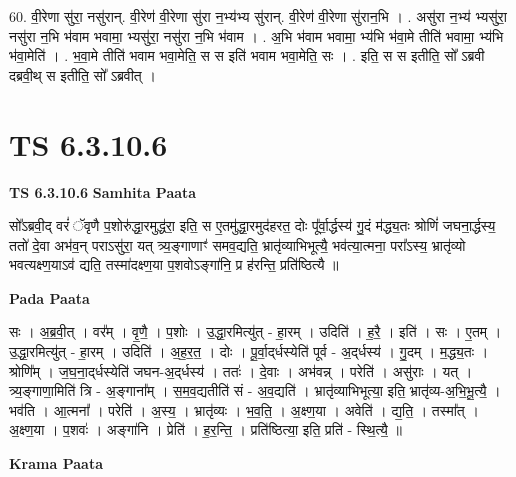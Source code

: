 \documentclass[17pt]{extarticle}
\begin{document}
60. वी॒रेणा सु॑रा॒ नसु॑रान्. वी॒रेण॑ वी॒रेणा सु॑रा न॒भ्य॑भ्य सु॑रान्. वी॒रेण॑ वी॒रेणा सु॑रान॒भि । . असु॑रा न॒भ्य॑ भ्यसु॑रा॒ नसु॑रा न॒भि भ॑वाम भवामा॒ भ्यसु॑रा॒ नसु॑रा न॒भि भ॑वाम । . अ॒भि भ॑वाम भवामा॒ भ्य॑भि भ॑वा॒मे तीति॑ भवामा॒ भ्य॑भि भ॑वा॒मेति॑ । . भ॒वा॒मे तीति॑ भवाम भवा॒मेति॒ स स इति॑ भवाम भवा॒मेति॒ सः । . इति॒ स स इतीति॒ सो᳚ ऽब्रवी दब्रवी॒थ् स इतीति॒ सो᳚ ऽब्रवीत् । \newline
\pagebreak
{}

\section{ TS 6.3.10.6 }

\textbf{TS 6.3.10.6 } \newline
\textbf{Samhita Paata} \newline

सो᳚ऽब्रवी॒द् वरं॑ ॅवृणै प॒शोरु॑द्धा॒रमुद्ध॑रा॒ इति॒ स ए॒तमु॑द्धा॒रमुद॑हरत॒ दोः पू᳚र्वा॒र्द्धस्य॑ गु॒दं म॑द्ध्य॒तः श्रोणिं॑ जघना॒र्द्धस्य॒ ततो॑ दे॒वा अभ॑व॒न् पराऽसु॑रा॒ यत् त्र्य॒ङ्गाणाꣳ॑ समव॒द्यति॒ भ्रातृ॑व्याभिभूत्यै॒ भव॑त्या॒त्मना॒ परा᳚ऽस्य॒ भ्रातृ॑व्यो भवत्यक्ष्ण॒याऽव॑ द्यति॒ तस्मा॑दक्ष्ण॒या प॒शवोऽङ्गा॑नि॒ प्र ह॑रन्ति॒ प्रति॑ष्ठित्यै ॥ \newline

\textbf{Pada Paata} \newline

सः । अ॒ब्र॒वी॒त् । वर᳚म् । वृ॒णै॒ । प॒शोः । उ॒द्धा॒रमित्यु॑त् - हा॒रम् । उदिति॑ । ह॒रै॒ । इति॑ । सः । ए॒तम् । उ॒द्धा॒रमित्यु॑त् - हा॒रम् । उदिति॑ । अ॒ह॒र॒त॒ । दोः । पू॒र्वा॒द्‌र्धस्येति॑ पूर्व - अ॒द्‌र्धस्य॑ । गु॒दम् । म॒द्ध्य॒तः । श्रोणि᳚म् । ज॒घ॒ना॒द्‌र्धस्येति॑ जघन-अ॒द्‌र्धस्य॑ । ततः॑ । दे॒वाः । अभ॑वन्न् । परेति॑ । असु॑राः । यत् । त्र्य॒ङ्गाणा॒मिति॑ त्रि - अ॒ङ्गाना᳚म् । स॒म॒व॒द्यतीति॑ सं - अ॒व॒द्यति॑ । भ्रातृ॑व्याभिभूत्या॒ इति॒ भ्रातृ॑व्य-अ॒भि॒भू॒त्यै॒ । भव॑ति । आ॒त्मना᳚ । परेति॑ । अ॒स्य॒ । भ्रातृ॑व्यः । भ॒व॒ति॒ । अ॒क्ष्ण॒या । अवेति॑ । द्य॒ति॒ । तस्मा᳚त् । अ॒क्ष्ण॒या । प॒शवः॑ । अङ्गा॑नि । प्रेति॑ । ह॒र॒न्ति॒ । प्रति॑ष्ठित्या॒ इति॒ प्रति॑ - स्थि॒त्यै॒ ॥  \newline


\textbf{Krama Paata} \newline
\end{document}
